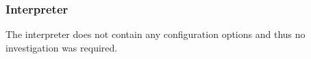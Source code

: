 \subsubsection{Interpreter}
\label{section:perf-interpreter}



The interpreter does not contain any configuration options and thus no investigation was required.